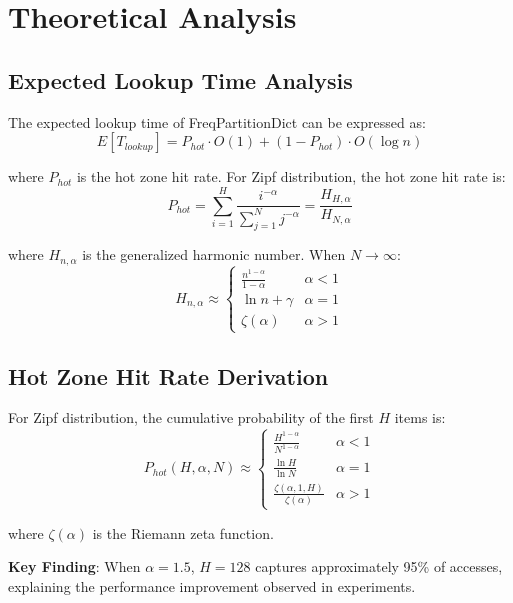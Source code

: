 \documentclass[11pt,a4paper]{article}
\begin{document}
\appendix

\section{Theoretical Analysis}

\subsection{Expected Lookup Time Analysis}

The expected lookup time of FreqPartitionDict can be expressed as:
\begin{equation}
E[T_{lookup}] = P_{hot} \cdot O(1) + (1 - P_{hot}) \cdot O(\log n)
\end{equation}

where $P_{hot}$ is the hot zone hit rate. For Zipf distribution, the hot zone hit rate is:
\begin{equation}
P_{hot} = \sum_{i=1}^{H} \frac{i^{-\alpha}}{\sum_{j=1}^{N} j^{-\alpha}} = \frac{H_{H,\alpha}}{H_{N,\alpha}}
\end{equation}

where $H_{n,\alpha}$ is the generalized harmonic number. When $N \to \infty$:
\begin{equation}
H_{n,\alpha} \approx \begin{cases}
\frac{n^{1-\alpha}}{1-\alpha} & \alpha < 1 \\
\ln n + \gamma & \alpha = 1 \\
\zeta(\alpha) & \alpha > 1
\end{cases}
\end{equation}

\subsection{Hot Zone Hit Rate Derivation}

For Zipf distribution, the cumulative probability of the first $H$ items is:
\begin{equation}
P_{hot}(H, \alpha, N) \approx \begin{cases}
\frac{H^{1-\alpha}}{N^{1-\alpha}} & \alpha < 1 \\
\frac{\ln H}{\ln N} & \alpha = 1 \\
\frac{\zeta(\alpha, 1, H)}{\zeta(\alpha)} & \alpha > 1
\end{cases}
\end{equation}

where $\zeta(\alpha)$ is the Riemann zeta function.

\textbf{Key Finding}: When $\alpha = 1.5$, $H = 128$ captures approximately 95\% of accesses, explaining the performance improvement observed in experiments.
\end{document}
